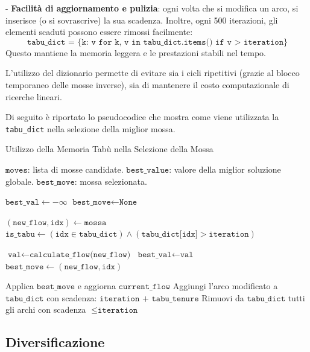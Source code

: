 \documentclass[12pt,a4paper]{article}
\begin{document}
    
- \textbf{Facilità di aggiornamento e pulizia}: ogni volta che si modifica un arco, si inserisce (o si sovrascrive) la sua scadenza. Inoltre, ogni 500 iterazioni, gli elementi scaduti possono essere rimossi facilmente:
    \[
    \texttt{tabu\_dict = \{k: v for k, v in tabu\_dict.items() if v > iteration\}}
    \]
    Questo mantiene la memoria leggera e le prestazioni stabili nel tempo.


L’utilizzo del dizionario permette di evitare sia i cicli ripetitivi (grazie al blocco temporaneo delle mosse inverse), sia di mantenere il costo computazionale di ricerche lineari.
    
Di seguito è riportato lo pseudocodice che mostra come viene utilizzata la \texttt{tabu\_dict} nella selezione della miglior mossa.

\begin{algorithm}[H]
\caption{Utilizzo della Memoria Tabù nella Selezione della Mossa}
\label{alg:tabu_usage}
\begin{algorithmic}[1]
\REQUIRE $\texttt{moves}$: lista di mosse candidate.
\REQUIRE $\texttt{best\_value}$: valore della miglior soluzione globale.
\ENSURE $\texttt{best\_move}$: mossa selezionata.

\STATE $\texttt{best\_val} \gets -\infty$
\STATE $\texttt{best\_move} \gets \texttt{None}$

    \STATE $(\texttt{new\_flow}, \texttt{idx}) \gets \texttt{mossa}$
    \STATE $\texttt{is\_tabu} \gets (\texttt{idx} \in \texttt{tabu\_dict}) \land (\texttt{tabu\_dict[idx]} > \texttt{iteration})$

        \STATE $\texttt{val} \gets \texttt{calculate\_flow(new\_flow)}$
            \STATE $\texttt{best\_val} \gets \texttt{val}$
            \STATE $\texttt{best\_move} \gets (\texttt{new\_flow}, \texttt{idx})$
        \ENDIF
    \ENDIF
\ENDFOR

\STATE Applica $\texttt{best\_move}$ e aggiorna $\texttt{current\_flow}$
\STATE Aggiungi l'arco modificato a $\texttt{tabu\_dict}$ con scadenza: $\texttt{iteration + tabu\_tenure}$
    \STATE Rimuovi da $\texttt{tabu\_dict}$ tutti gli archi con scadenza $\leq \texttt{iteration}$
\ENDIF
\end{algorithmic}
\end{algorithm}

\subsection{Diversificazione}
\end{document}
